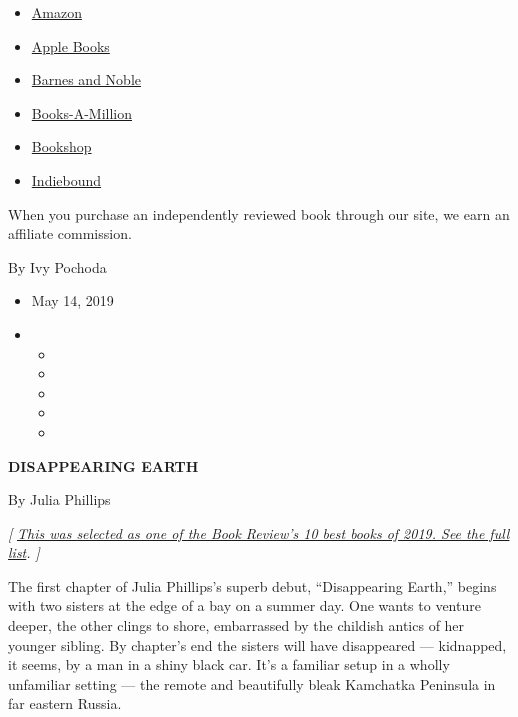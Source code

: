 \begin{itemize}
\tightlist
\item
  \href{https://www.amazon.com/gp/search?index=books\&tag=NYTBSREV-20\&field-keywords=Disappearing+Earth+Julia+Phillips}{Amazon}
\item
  \href{https://du-gae-books-dot-nyt-du-prd.appspot.com/buy?title=Disappearing+Earth\&author=Julia+Phillips}{Apple
  Books}
\item
  \href{https://www.anrdoezrs.net/click-7990613-11819508?url=https\%3A\%2F\%2Fwww.barnesandnoble.com\%2Fw\%2F\%3Fean\%3D9780525520412}{Barnes
  and Noble}
\item
  \href{https://www.anrdoezrs.net/click-7990613-35140?url=https\%3A\%2F\%2Fwww.booksamillion.com\%2Fp\%2FDisappearing\%2BEarth\%2FJulia\%2BPhillips\%2F9780525520412}{Books-A-Million}
\item
  \href{https://bookshop.org/a/3546/9780525520412}{Bookshop}
\item
  \href{https://www.indiebound.org/book/9780525520412?aff=NYT}{Indiebound}
\end{itemize}

When you purchase an independently reviewed book through our site, we
earn an affiliate commission.

By Ivy Pochoda

\begin{itemize}
\item
  May 14, 2019
\item
  \begin{itemize}
  \item
  \item
  \item
  \item
  \item
  \end{itemize}
\end{itemize}

\textbf{DISAPPEARING EARTH}

By Julia Phillips

\emph{{[}}
\href{https://www.nytimes3xbfgragh.onion/2019/11/22/books/review/best-books.html}{\emph{This
was selected as one of the Book Review's 10 best books of 2019. See the
full list}}\emph{. {]}}

The first chapter of Julia Phillips's superb debut, ``Disappearing
Earth,'' begins with two sisters at the edge of a bay on a summer day.
One wants to venture deeper, the other clings to shore, embarrassed by
the childish antics of her younger sibling. By chapter's end the sisters
will have disappeared --- kidnapped, it seems, by a man in a shiny black
car. It's a familiar setup in a wholly unfamiliar setting --- the remote
and beautifully bleak Kamchatka Peninsula in far eastern Russia.

